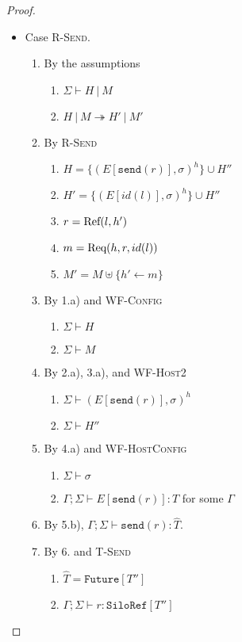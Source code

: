 \begin{proof}
\begin{itemize}
\item Case \textsc{R-Send}.
\begin{enumerate}
\item By the assumptions
  \begin{enumerate}[label=(\alph*)]
  \item $\Sigma \vdash H~|~M$
  \item $H~|~M \twoheadrightarrow H'~|~M'$
  \end{enumerate}
\item By \textsc{R-Send}
  \begin{enumerate}[label=(\alph*)]
  \item $H  = \{ (E[\texttt{send}(r)], \sigma)^h \} \cup H''$
  \item $H' = \{ (E[id(l)], \sigma)^h \} \cup H''$
  \item $r  = {\textrm{Ref}(l, h')}$
  \item $m  = {\textrm{Req}(h, r, id(l))}$
  \item $M' = M \uplus \{ h' \leftarrow m \}$
  \end{enumerate}
\item By 1.a) and \textsc{WF-Config}
  \begin{enumerate}[label=(\alph*)]
  \item $\Sigma \vdash H$
  \item $\Sigma \vdash M$
  \end{enumerate}
\item By 2.a), 3.a), and \textsc{WF-Host2}
  \begin{enumerate}[label=(\alph*)]
  \item $\Sigma \vdash (E[\texttt{send}(r)], \sigma)^h$
  \item $\Sigma \vdash H''$
  \end{enumerate}
\item By 4.a) and \textsc{WF-HostConfig}
  \begin{enumerate}[label=(\alph*)]
  \item $\Sigma \vdash \sigma$
  \item $\Gamma ; \Sigma \vdash E[\texttt{send}(r)] : T$ for some $\Gamma$
  \end{enumerate}
\item By 5.b), $\Gamma ; \Sigma \vdash \texttt{send}(r) : \hat{T}$.
\item By 6. and \textsc{T-Send}
  \begin{enumerate}[label=(\alph*)]
  \item $\hat{T} = \texttt{Future}[T'']$
  \item $\Gamma ; \Sigma \vdash r : \texttt{SiloRef}[T'']$

\end{enumerate}
\end{enumerate}
\end{itemize}
\end{proof}
